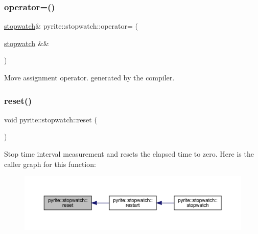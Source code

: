 \subsubsection{\texorpdfstring{operator=()}{operator=()}\hspace{0.1cm}{\footnotesize\ttfamily [2/2]}}
{\footnotesize\ttfamily \mbox{\hyperlink{classpyrite_1_1stopwatch}{stopwatch}}\& pyrite\+::stopwatch\+::operator= (\begin{DoxyParamCaption}\item[{\mbox{\hyperlink{classpyrite_1_1stopwatch}{stopwatch}} \&\&}]{ }\end{DoxyParamCaption})\hspace{0.3cm}{\ttfamily [default]}}

Move assignment operator. generated by the compiler. \mbox{\label{classpyrite_1_1stopwatch_ac6dd6a9c17ec2f2afc6b99cf1be86e04}} 
\subsubsection{\texorpdfstring{reset()}{reset()}}
{\footnotesize\ttfamily void pyrite\+::stopwatch\+::reset (\begin{DoxyParamCaption}{ }\end{DoxyParamCaption})\hspace{0.3cm}{\ttfamily [inline]}}

Stop time interval measurement and resets the elapsed time to zero. Here is the caller graph for this function\+:
\nopagebreak
\begin{figure}[H]
\begin{center}
\leavevmode
\includegraphics[width=350pt]{d6/dd1/classpyrite_1_1stopwatch_ac6dd6a9c17ec2f2afc6b99cf1be86e04_icgraph}
\end{center}
\end{figure}
\mbox{\label{classpyrite_1_1stopwatch_a3fc39be2c2271eb57b9d8d30f5632dea}} 
